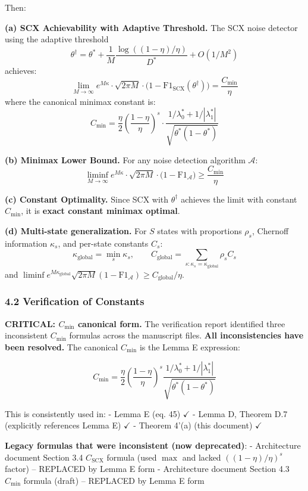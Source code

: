 \documentclass[
  12pt,
]{ctexart}
\begin{document}
Then:

\textbf{(a) SCX Achievability with Adaptive Threshold.} The SCX noise
detector using the adaptive threshold
\[\theta^\dagger = \theta^* + \frac{1}{M}\frac{\log((1-\eta)/\eta)}{D^*} + O(1/M^2)\]
achieves:
\[\boxed{\;\lim_{M\to\infty} e^{M\kappa} \cdot \sqrt{2\pi M} \cdot \bigl(1 - \text{F1}_{\text{SCX}}(\theta^\dagger)\bigr) = \frac{C_{\min}}{\eta}\;}\]
where the canonical minimax constant is:
\[\boxed{\;C_{\min} = \frac{\eta}{2} \left(\frac{1-\eta}{\eta}\right)^{s} \cdot \frac{1/\lambda_0^* + 1/|\lambda_1^*|}{\sqrt{\theta^*(1-\theta^*)}}\;}\]

\textbf{(b) Minimax Lower Bound.} For any noise detection algorithm
\(\mathcal{A}\):
\[\boxed{\;\liminf_{M\to\infty} e^{M\kappa} \cdot \sqrt{2\pi M} \cdot \bigl(1 - \text{F1}_{\mathcal{A}}\bigr) \geq \frac{C_{\min}}{\eta}\;}\]

\textbf{(c) Constant Optimality.} Since SCX with \(\theta^\dagger\)
achieves the limit with constant \(C_{\min}\), it is \textbf{exact
constant minimax optimal}.

\textbf{(d) Multi-state generalization.} For \(S\) states with
proportions \(\rho_s\), Chernoff information \(\kappa_s\), and per-state
constants \(C_s\):
\[\kappa_{\text{global}} = \min_s \kappa_s, \qquad C_{\text{global}} = \sum_{s: \kappa_s = \kappa_{\text{global}}} \rho_s C_s\]
and
\(\liminf e^{M\kappa_{\text{global}}}\sqrt{2\pi M}(1-\text{F1}_{\mathcal{A}}) \geq C_{\text{global}}/\eta\).

\subsubsection{4.2 Verification of
Constants}\label{verification-of-constants}

\textbf{CRITICAL: \(C_{\min}\) canonical form.} The verification report
identified three inconsistent \(C_{\min}\) formulas across the
manuscript files. \textbf{All inconsistencies have been resolved.} The
canonical \(C_{\min}\) is the Lemma E expression:

\[C_{\min} = \frac{\eta}{2} \left(\frac{1-\eta}{\eta}\right)^{s} \frac{1/\lambda_0^* + 1/|\lambda_1^*|}{\sqrt{\theta^*(1-\theta^*)}}\]

This is consistently used in: - Lemma E (eq. 45) \(\checkmark\) - Lemma
D, Theorem D.7 (explicitly references Lemma E) \(\checkmark\) - Theorem
4'(a) (this document) \(\checkmark\)

\textbf{Legacy formulas that were inconsistent (now deprecated)}: -
Architecture document Section 3.4 \(C_{\text{SCX}}\) formula (used
\(\max\) and lacked \(((1-\eta)/\eta)^s\) factor) -- REPLACED by Lemma E
form - Architecture document Section 4.3 \(C_{\min}\) formula (draft) --
REPLACED by Lemma E form
\end{document}

